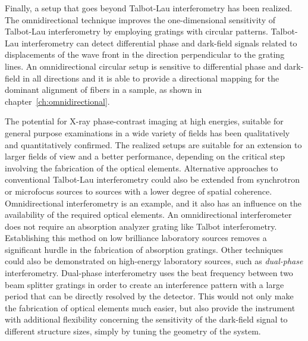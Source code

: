 Finally, a setup that goes beyond Talbot-Lau interferometry has been
realized. The omnidirectional technique improves the one-dimensional
sensitivity of Talbot-Lau interferometry by employing gratings with circular
patterns. Talbot-Lau interferometry can detect differential phase and
dark-field signals related to displacements of the wave front in the
direction perpendicular to the grating lines. An omnidirectional circular
setup is sensitive to differential phase and dark-field in all directions
and it is able to provide a directional mapping for the
dominant alignment of fibers in a sample, as shown in
chapter~\ref{ch:omnidirectional}.

The potential for X-ray phase-contrast imaging at high energies, suitable
for general purpose examinations in a wide variety of fields has been
qualitatively and quantitatively confirmed. The realized setups are suitable
for an extension to larger fields of view and a better performance,
depending on the critical step involving the fabrication of the optical
elements.
Alternative approaches to conventional Talbot-Lau interferometry could also be extended
from synchrotron or microfocus sources to sources with a lower degree of
spatial coherence. Omnidirectional interferometry is an example, and it also
has an influence on the availability of
the required optical elements. An omnidirectional 
interferometer does not require an absorption analyzer grating like Talbot
interferometry. Establishing this method on low brilliance laboratory
sources removes a significant hurdle in the fabrication of absorption
gratings. Other techniques could also be demonstrated on high-energy
laboratory sources, such as \emph{dual-phase} interferometry. Dual-phase
interferometry uses the beat frequency between two beam splitter gratings in order to create an
interference pattern with a large period that can be directly resolved by
the detector. This would not only make the fabrication of optical elements
much easier, but also provide the instrument with additional flexibility
concerning the sensitivity of the dark-field signal to different structure
sizes, simply by tuning the geometry of the system.
